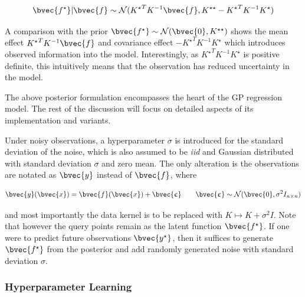 			\begin{equation}
				\bvec{f^{\star}} | \bvec{f} \sim \mathcal{N}({K^{\star}}^{T} K^{-1} \bvec{f}, K^{\star \star} - {K^{\star}}^{T} K^{-1} K^{\star})
			\label{Equation:InfereceConditionalDistribution}
			\end{equation}						
			
			A comparison with the prior $\bvec{f^{\star}} \sim \mathcal{N}(\bvec{0}, K^{\star \star})$ shows the mean effect ${K^{\star}}^{T} K^{-1} \bvec{f}$ and covariance effect $- {K^{\star}}^{T} K^{-1} K^{\star}$ which introduces observed information into the model. Interestingly, as ${K^{\star}}^{T} K^{-1} K^{\star}$ is positive definite, this intuitively means that the observation has reduced uncertainty in the model.
			
			The above posterior formulation encompasses the heart of the GP regression model. The rest of the discussion will focus on detailed aspects of its implementation and variants.
			
			
			Under noisy observations, a hyperparameter $\sigma$ is introduced for the standard deviation of the noise, which is also assumed to be \textit{iid} and Gaussian distributed with standard deviation $\sigma$ and zero mean. The only alteration is the observations are notated as $\bvec{y}$ instead of $\bvec{f}$, where 
			
			\begin{equation}
				\bvec{y}(\bvec{x}) = \bvec{f}(\bvec{x}) + \bvec{\upepsilon} \qquad \bvec{\upepsilon} \sim \mathcal{N}(\bvec{0}, \sigma^{2} I_{n \times n})
			\label{Equation:RegressionNoiseModel}
			\end{equation}
						
			and most importantly the data kernel is to be replaced with $K \mapsto K + \sigma^{2} I$. Note that however the query points remain as the latent function $\bvec{f^{\star}}$. If one were to predict future observations $\bvec{y^{\star}}$, then it suffices to generate $\bvec{f^{\star}}$ from the posterior and add randomly generated noise with standard deviation $\sigma$.
				
			\subsubsection{Hyperparameter Learning}
			\label{Background:GaussianProcess:Regression:HyperparameterLearning}
			
